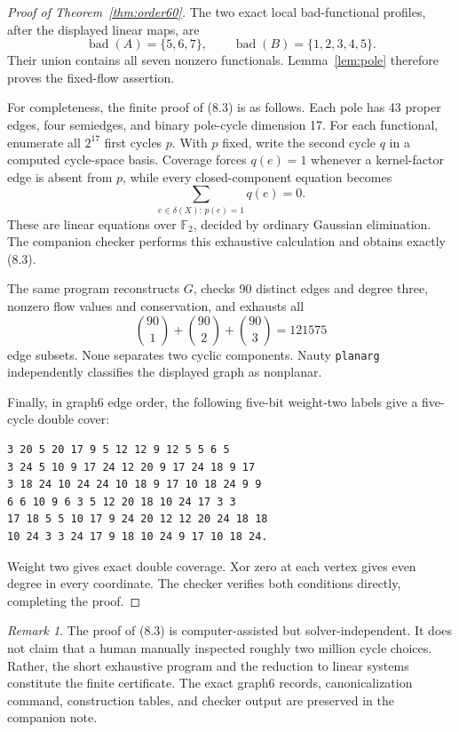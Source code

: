 \documentclass[11pt]{article}
\theoremstyle{definition}
\theoremstyle{remark}
\newtheorem{remark}[theorem]{Remark}
\newcommand{\F}{\mathbb F}
\begin{document}
\begin{proof}[Proof of Theorem~\ref{thm:order60}]
The two exact local bad-functional profiles, after the displayed linear
maps, are
\[
                \operatorname{bad}(A)=\{5,6,7\},\qquad
                \operatorname{bad}(B)=\{1,2,3,4,5\}.    \tag{8.3}
\]
Their union contains all seven nonzero functionals.  Lemma~\ref{lem:pole}
therefore proves the fixed-flow assertion.

For completeness, the finite proof of (8.3) is as follows.  Each pole has
43 proper edges, four semiedges, and binary pole-cycle dimension 17.
For each functional, enumerate all \(2^{17}\) first cycles \(p\).  With
\(p\) fixed, write the second cycle \(q\) in a computed cycle-space basis.
Coverage forces \(q(e)=1\) whenever a kernel-factor edge is absent from
\(p\), while every closed-component equation becomes
\[
              \sum_{e\in\delta(X):\,p(e)=1}q(e)=0.
                                                        \tag{8.4}
\]
These are linear equations over \(\F_2\), decided by ordinary Gaussian
elimination.  The companion checker performs this exhaustive calculation
and obtains exactly (8.3).

The same program reconstructs \(G\), checks 90 distinct edges and degree
three, nonzero flow values and conservation, and exhausts all
\[
            {90\choose1}+{90\choose2}+{90\choose3}=121575
                                                        \tag{8.5}
\]
edge subsets.  None separates two cyclic components.  Nauty
\texttt{planarg} independently classifies the displayed graph as
nonplanar.

Finally, in graph6 edge order, the following five-bit weight-two labels
give a five-cycle double cover:
\begin{verbatim}
3 20 5 20 17 9 5 12 12 9 12 5 5 6 5
3 24 5 10 9 17 24 12 20 9 17 24 18 9 17
3 18 24 10 24 24 10 18 9 17 10 18 24 9 9
6 6 10 9 6 3 5 12 20 18 10 24 17 3 3
17 18 5 5 10 17 9 24 20 12 12 20 24 18 18
10 24 3 3 24 17 9 18 10 24 9 17 10 18 24.
\end{verbatim}
Weight two gives exact double coverage.  Xor zero at each vertex gives
even degree in every coordinate.  The checker verifies both conditions
directly, completing the proof.
\end{proof}

\begin{remark}
The proof of (8.3) is computer-assisted but solver-independent.  It does
not claim that a human manually inspected roughly two million cycle
choices.  Rather, the short exhaustive program and the reduction to
linear systems constitute the finite certificate.  The exact graph6
records, canonicalization command, construction tables, and checker
output are preserved in the companion note.
\end{remark}
\end{document}
